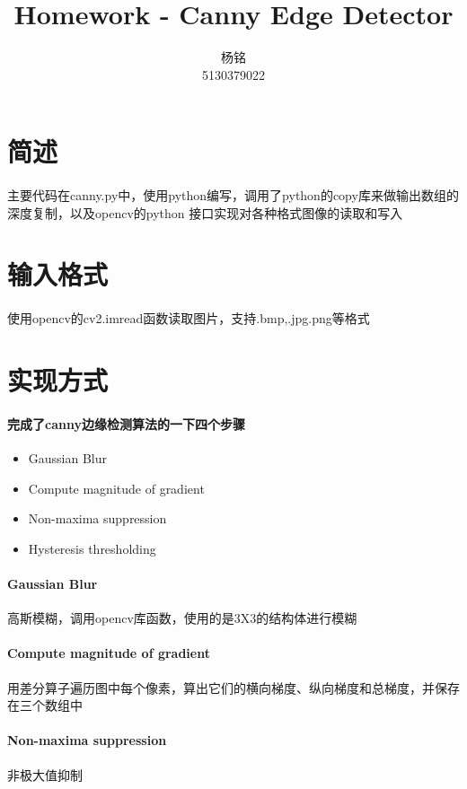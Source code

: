\documentclass{article}
\author{杨铭\\5130379022}
\title{Homework - Canny Edge Detector}
\begin{document}
    \maketitle
    \section{简述}
        \paragraph{}主要代码在canny.py中，使用python编写，调用了python的copy库来做输出数组的深度复制，以及opencv的python
    接口实现对各种格式图像的读取和写入
    \section{输入格式}
        \paragraph{}使用opencv的cv2.imread函数读取图片，支持.bmp,.jpg.png等格式
    \section{实现方式}
        \paragraph{完成了canny边缘检测算法的一下四个步骤}
            \begin{itemize}
              \item Gaussian Blur
              \item Compute magnitude of gradient
              \item Non-maxima suppression
              \item Hysteresis thresholding
            \end{itemize}
        \paragraph{Gaussian Blur}高斯模糊，调用opencv库函数，使用的是3X3的结构体进行模糊\\
        \paragraph{Compute magnitude of gradient}用差分算子遍历图中每个像素，算出它们的横向梯度、纵向梯度和总梯度，并保存在三个数组中\\
        \paragraph{Non-maxima suppression}非极大值抑制
\end{document}
